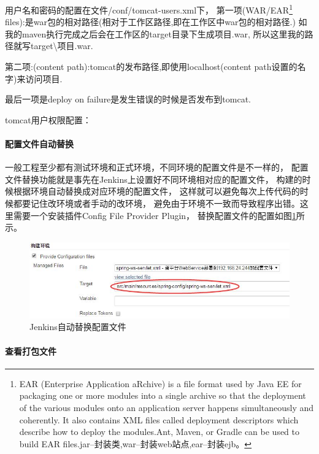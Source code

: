 \documentclass{book}
\begin{document}
用户名和密码的配置在文件/conf/tomcat-users.xml下，
第一项(WAR/EAR\footnote{EAR (Enterprise Application aRchive) is a file format used by Java EE for packaging one or more modules into a single archive so that the deployment of the various modules onto an application server happens simultaneously and coherently. It also contains XML files called deployment descriptors which describe how to deploy the modules.Ant, Maven, or Gradle can be used to build EAR files.jar--封装类,war--封装web站点,ear--封装ejb。} files):是war包的相对路径(相对于工作区路径,即在工作区中war包的相对路径.)
如我的maven执行完成之后会在工作区的target目录下生成项目.war,
所以这里我的路径就写target\textbackslash 项目.war.

第二项:(content path):tomcat的发布路径,即使用localhost(content path设置的名字)来访问项目.

最后一项是deploy on failure是发生错误的时候是否发布到tomcat.

tomcat用户权限配置：

\paragraph{配置文件自动替换}

一般工程至少都有测试环境和正式环境，不同环境的配置文件是不一样的，
配置文件替换功能就是事先在Jenkins上设置好不同环境相对应的配置文件，
构建的时候根据环境自动替换成对应环境的配置文件，
这样就可以避免每次上传代码的时候都要记住改环境或者手动的改环境，
避免由于环境不一致而导致程序出错。这里需要一个安装插件Config File Provider Plugin，
替换配置文件的配置如图\ref{fig:JenkinsConfigurationFileReplace}所示。

\begin{figure}[htbp]
	\centering
	\includegraphics[scale=0.5]{JenkinsConfigurationFileReplace.jpg}
	\caption{Jenkins自动替换配置文件}
	\label{fig:JenkinsConfigurationFileReplace}
\end{figure}

\paragraph{查看打包文件}
\end{document}
